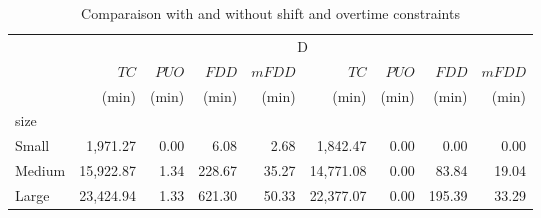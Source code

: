 \begin{table}[htb]
\centering
\caption{Comparaison with and without shift and overtime constraints}
\label{tab:lift_shift_constraints}
\begin{tabular}{lrrrrrrrr}
\toprule
 & \multicolumn{8}{c}{D} \\
 & $TC$ & $PUO$ & $FDD$ & $mFDD$ & $TC$ & $PUO$ & $FDD$ & $mFDD$ \\
 & (min) & (min) & (min) & (min) & (min) & (min) & (min) & (min) \\
size &  &  &  &  &  &  &  &  \\
\midrule
Small & 1,971.27 & 0.00 & 6.08 & 2.68 & 1,842.47 & 0.00 & 0.00 & 0.00 \\
Medium & 15,922.87 & 1.34 & 228.67 & 35.27 & 14,771.08 & 0.00 & 83.84 & 19.04 \\
Large & 23,424.94 & 1.33 & 621.30 & 50.33 & 22,377.07 & 0.00 & 195.39 & 33.29 \\
\bottomrule
\end{tabular}
\end{table}
